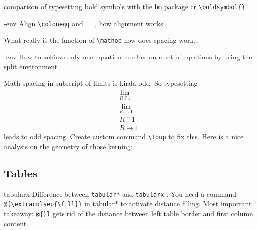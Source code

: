 \begin{macro}{\bm}
  comparison of typesetting bold symbols with the \verb|bm| package or \verb|\boldsymbol{}| 
\end{macro}

\begin{macro}{\align-env}
  Align \verb|\coloneqq| and $=$, how alignment works 
\end{macro}

\begin{macro}{\mathop}
  What really is the function of \verb|\mathop| how does spacing work,.. 
\end{macro}

\begin{macro}{\split-env}
  How to achieve only one equation number on a set of equations by using the split environment 
\end{macro}

\begin{macro}{\toup}
  Math spacing in subscript of limits is kinda odd. So typesetting 
  \begin{gather}
    \lim_{R\mathrel{\uparrow} 1}\\  
    \lim_{R\mathrel{\to} 1}\\       
    R\mathrel{\uparrow} 1\\
    R\mathrel{\to} 1
\end{gather}
leads to odd spacing. Create custom command \verb|\toup| to fix this. Here is a nice analysis on the geometry of those kerning: 
\end{macro}

\subsection{Tables}
\begin{macro}{tabularx}
  Difference between \verb|tabular*| and \verb|tabularx| . You need a command \verb|@{\extracolsep{\fill}}| in tabular* to activate distance filling. Most important takeaway: \verb|@{}l| gets rid of the distance between left table border and first column content. 
\end{macro}

